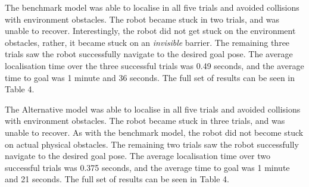\documentclass[a4paper]{article}
\begin{document}
\begin{minipage}{0.45\textwidth}
The benchmark model was able to localise in all five trials and avoided collisions with environment obstacles. The robot became stuck in two trials, and was unable to recover. Interestingly, the robot did not get stuck on the environment obstacles, rather, it became stuck on an \textit{invisible} barrier. The remaining three trials saw the robot successfully navigate to the desired goal pose. The average localisation time over the three successful trials was 0.49 seconds, and the average time to goal was 1 minute and 36 seconds. The full set of results can be seen in Table 4.
\end{minipage}
\hspace{1cm}
\begin{minipage}{0.45\textwidth}
\centering
{}
\end{minipage}

\vspace{0.5cm}

The Alternative model was able to localise in all five trials and avoided collisions with environment obstacles. The robot became stuck in three trials, and was unable to recover. As with the benchmark model, the robot did not become stuck on actual physical obstacles. The remaining two trials saw the robot successfully navigate to the desired goal pose. The average localisation time over two successful trials was 0.375 seconds, and the average time to goal was 1 minute and 21 seconds. The full set of results can be seen in Table 4.
\end{document}
